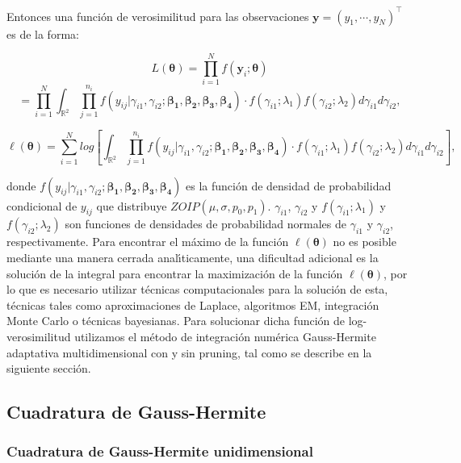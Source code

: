 Entonces una funci\'{o}n de verosimilitud para las observaciones $\mathbf{y}=(y_1, \cdots, y_N)^{\top}$ es de la forma:

\[
L(\boldsymbol{\theta})=\prod_{i=1}^{N}f(\mathbf{y}_i;\boldsymbol{\theta})
\]
\[
=\prod_{i=1}^{N}\int_{\mathbb{R}^2}\prod_{j=1}^{n_i}f(y_{ij}|\gamma_{i1},\gamma_{i2};\boldsymbol{\beta_1}, \boldsymbol{\beta_2}, \boldsymbol{\beta_3}, \boldsymbol{\beta_4})\cdot f(\gamma_{i1};\lambda_1) f(\gamma_{i2};\lambda_2) d\gamma_{i1}d\gamma_{i2},
\]

\begin{equation}
\ell(\boldsymbol{\theta})=\sum_{i=1}^{N}log \left[\int_{\mathbb{R}^2}\prod_{j=1}^{n_i}f(y_{ij}|\gamma_{i1},\gamma_{i2};\boldsymbol{\beta_1}, \boldsymbol{\beta_2}, \boldsymbol{\beta_3}, \boldsymbol{\beta_4})\cdot f(\gamma_{i1};\lambda_1) f(\gamma_{i2};\lambda_2) d\gamma_{i1}d\gamma_{i2}\right],
 \label{func_ver_mix}
\end{equation}


donde $f(y_{ij}|\gamma_{i1},\gamma_{i2};\boldsymbol{\beta_1}, \boldsymbol{\beta_2}, \boldsymbol{\beta_3}, \boldsymbol{\beta_4})$ es la funci\'{o}n de densidad de probabilidad condicional de $y_{ij}$ que distribuye $ZOIP(\mu,\sigma,p_0,p_1)$. $\gamma_{i1}$, $\gamma_{i2}$ y $f(\gamma_{i1};\lambda_1)$ y $f(\gamma_{i2};\lambda_2)$ son funciones de densidades de probabilidad normales de $\gamma_{i1}$ y $\gamma_{i2}$, respectivamente. Para encontrar el m\'{a}ximo de la funci\'{o}n $\ell(\boldsymbol{\theta})$ no es posible mediante una manera cerrada anal\'{\i}ticamente, una dificultad adicional es la soluci\'{o}n de la integral para encontrar la maximizaci\'{o}n de la funci\'{o}n $\ell(\boldsymbol{\theta})$, por lo que es necesario utilizar t\'{e}cnicas computacionales para la soluci\'{o}n de esta, t\'{e}cnicas tales como aproximaciones de Laplace, algoritmos EM, integraci\'{o}n Monte Carlo o t\'{e}cnicas bayesianas. Para solucionar dicha funci\'{o}n de log-verosimilitud utilizamos el m\'{e}todo de integraci\'{o}n num\'{e}rica Gauss-Hermite adaptativa multidimensional con y sin pruning, tal como se describe en la siguiente secci\'{o}n.


\subsection{Cuadratura de Gauss-Hermite}\label{sec:Cuadratura}

\subsubsection{Cuadratura de Gauss-Hermite unidimensional}

